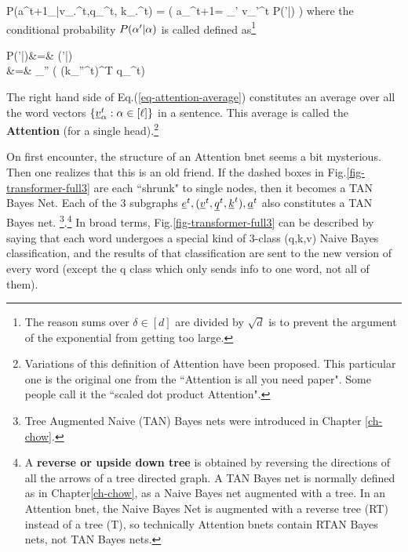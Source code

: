 \beq\color{blue}
P(a^{t+1}_\alp|v_.^t,q_\alp^t,
 k_.^t)
=
\indi(\;\;\;
a_\alp^{t+1}=
\sum_{{\alp'}\in[\ell]}
v_{\alp'}^t
P({\alp'}|\alp)
\;\;)
\label{eq-attention-average}
\eeq
where the conditional
probability 
$P({\alpha'}|\alpha)$ is 
called defined as\footnote{
The reason sums over 
$\delta\in[d]$ are divided by
$\sqrt{d}$ is to 
prevent the argument of
the exponential from getting too
large.
}

\beqa
P({\alp'}|\alp)&=&
\softmax{}(\alp'|\alp)
\\
&=&
{\sum_{\alp''\in [\ell]}
\exp\left(
(k_{\alp''}^t)^T q_\alp^t\right)}
\eeqa

The right hand side of Eq.(\ref{eq-attention-average})
constitutes an average over 
all the word vectors $\{{\underline{v}}_\alpha^t: \alpha\in[\ell]\}$
in a sentence.
This average is called the {\bf Attention}
(for a single head).\footnote{Variations
of this definition of Attention
have been proposed. This particular one
is the original
one from the ``Attention is all
you need paper". Some people
call it the ``scaled dot product Attention".}

\beq
{}
\eeq



On first encounter, the structure of an Attention bnet
seems a bit mysterious. Then one realizes that this is
an old friend. 
If the dashed  boxes in 
Fig.\ref{fig-transformer-full3} are each ``shrunk" to single nodes,
then it becomes a TAN Bayes Net. Each of the 3 subgraphs ${\underline{e}}^t, ({\underline{v}}^t, {\underline{q}}^t, {\underline{k}}^t), {\underline{a}}^t $
also constitutes a TAN Bayes net. \footnote{Tree Augmented Naive (TAN) Bayes nets
were introduced in Chapter \ref{ch-chow}.}.\footnote{A {\bf reverse or upside down tree} is obtained by reversing the directions of all the arrows of a tree directed graph. A TAN Bayes net is normally defined as in Chapter\ref{ch-chow}, as a Naive Bayes net augmented with a tree. In an Attention bnet, the Naive Bayes Net is augmented with a reverse tree (RT) instead of a tree (T), so technically Attention bnets contain RTAN Bayes nets, not TAN Bayes nets. }
In broad terms, Fig.\ref{fig-transformer-full3}
can be described by saying that
each word undergoes a special
kind of 3-class (q,k,v) Naive Bayes
classification,
and the results of that classification
are sent to the new version of every word (except the q class which only sends
info to one word, not all of them).

